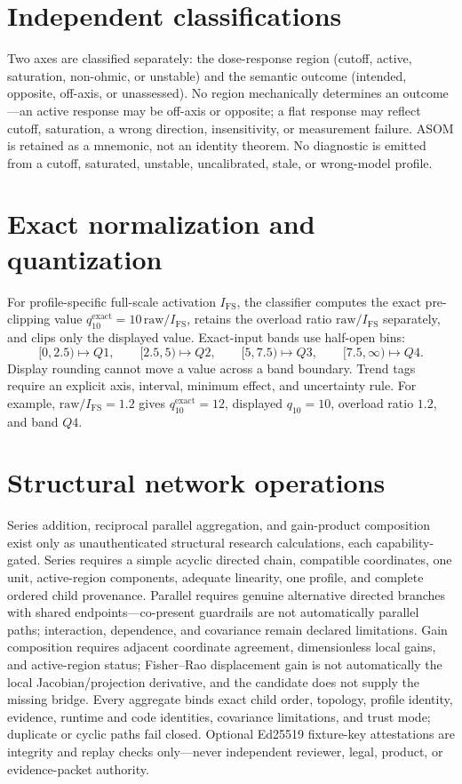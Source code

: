 \documentclass[11pt]{amsart}
\theoremstyle{definition}
\theoremstyle{remark}
\begin{document}
\section{Independent classifications}\label{sec:class}

Two axes are classified separately: the dose-response region (cutoff, active, saturation, non-ohmic, or unstable) and the semantic outcome (intended, opposite, off-axis, or unassessed). No region mechanically determines an outcome---an active response may be off-axis or opposite; a flat response may reflect cutoff, saturation, a wrong direction, insensitivity, or measurement failure. ASOM is retained as a mnemonic, not an identity theorem. No diagnostic is emitted from a cutoff, saturated, unstable, uncalibrated, stale, or wrong-model profile.

\section{Exact normalization and quantization}\label{sec:q4}

For profile-specific full-scale activation $I_{\mathrm{FS}}$, the classifier computes the exact pre-clipping value $q_{10}^{\mathrm{exact}} = 10\,\mathrm{raw}/I_{\mathrm{FS}}$, retains the overload ratio $\mathrm{raw}/I_{\mathrm{FS}}$ separately, and clips only the displayed value. Exact-input bands use half-open bins:
\[
[0,2.5) \mapsto Q1, \qquad [2.5,5) \mapsto Q2, \qquad [5,7.5) \mapsto Q3, \qquad [7.5,\infty) \mapsto Q4 .
\]
Display rounding cannot move a value across a band boundary. Trend tags require an explicit axis, interval, minimum effect, and uncertainty rule. For example, $\mathrm{raw}/I_{\mathrm{FS}}=1.2$ gives $q_{10}^{\mathrm{exact}}=12$, displayed $q_{10}=10$, overload ratio $1.2$, and band $Q4$.

\section{Structural network operations}\label{sec:networks}

Series addition, reciprocal parallel aggregation, and gain-product composition exist only as unauthenticated structural research calculations, each capability-gated. Series requires a simple acyclic directed chain, compatible coordinates, one unit, active-region components, adequate linearity, one profile, and complete ordered child provenance. Parallel requires genuine alternative directed branches with shared endpoints---co-present guardrails are not automatically parallel paths; interaction, dependence, and covariance remain declared limitations. Gain composition requires adjacent coordinate agreement, dimensionless local gains, and active-region status; Fisher--Rao displacement gain is not automatically the local Jacobian/projection derivative, and the candidate does not supply the missing bridge. Every aggregate binds exact child order, topology, profile identity, evidence, runtime and code identities, covariance limitations, and trust mode; duplicate or cyclic paths fail closed. Optional Ed25519 fixture-key attestations are integrity and replay checks only---never independent reviewer, legal, product, or evidence-packet authority.
\end{document}
